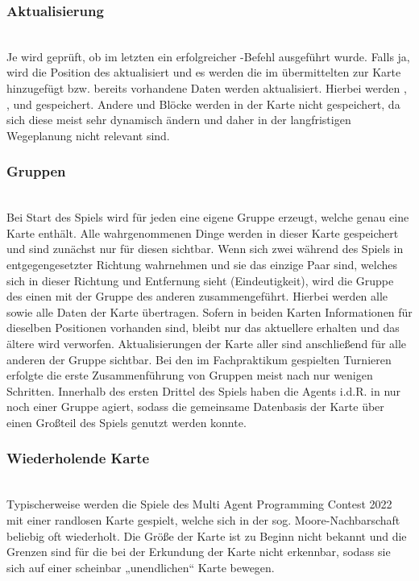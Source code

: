 \subsubsection{Aktualisierung} ~\\
Je \Agent wird geprüft, ob im letzten \Step ein erfolgreicher \move-Befehl ausgeführt wurde. Falls ja, wird die Position des \Agents aktualisiert und es werden die im \Percept übermittelten \Things zur Karte hinzugefügt bzw. bereits vorhandene Daten werden aktualisiert. Hierbei werden \Dispenser, \GoalZones, \RoleZones und \Obstacles gespeichert. Andere \Agents und Blöcke werden in der Karte nicht gespeichert, da sich diese meist sehr dynamisch ändern und daher in der langfristigen Wegeplanung nicht relevant sind.

\subsubsection{Gruppen} ~\\
Bei Start des Spiels wird für jeden \Agent eine eigene Gruppe erzeugt, welche genau eine Karte enthält. Alle wahrgenommenen Dinge werden in dieser Karte gespeichert und sind zunächst nur für diesen \Agent sichtbar. 
Wenn sich zwei \Agents während des Spiels in entgegengesetzter Richtung wahrnehmen und sie das einzige Paar sind, welches sich in dieser Richtung und Entfernung sieht (Eindeutigkeit), wird die Gruppe des einen \Agent mit der Gruppe des anderen \Agent zusammengeführt. Hierbei werden alle \Agents sowie alle Daten der Karte übertragen. Sofern in beiden Karten Informationen für dieselben Positionen vorhanden sind, bleibt nur das aktuellere \NextMapTile erhalten und das ältere wird verworfen. Aktualisierungen der Karte aller \Agents sind anschließend für alle anderen \Agents der Gruppe sichtbar. \newline
Bei den im Fachpraktikum gespielten Turnieren erfolgte die erste Zusammenführung von Gruppen meist nach nur wenigen Schritten. Innerhalb des ersten Drittel des Spiels haben die Agents i.d.R. in nur noch einer Gruppe agiert, sodass die gemeinsame Datenbasis der Karte über einen Großteil des Spiels genutzt werden konnte. 

\subsubsection{Wiederholende Karte} ~\\
Typischerweise werden die Spiele des Multi Agent Programming Contest 2022 mit einer randlosen Karte gespielt, welche sich in der sog. Moore-Nachbarschaft beliebig oft wiederholt. Die Größe der Karte ist zu Beginn nicht bekannt und die Grenzen sind für die \Agents bei der Erkundung der Karte nicht erkennbar, sodass sie sich auf einer scheinbar „unendlichen“ Karte bewegen.\newline

